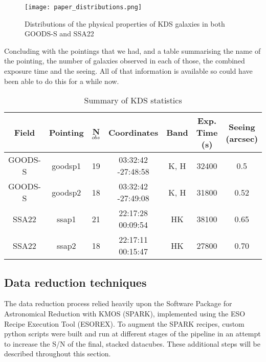\documentclass[a4paper,fleqn,usenatbib]{mn2e}
\begin{document}
\begin{figure}
\centering
\texttt{[image: paper\_distributions.png]}
\caption{Distributions of the physical properties of KDS galaxies in both GOODS-S and SSA22}
\label{fig:distributions}
\end{figure}

Concluding with the pointings that we had, and a table summarising the name of the pointing, the number of galaxies observed in each of those, the combined exposure time and the seeing. All of that information is available so could have been able to do this for a while now.

\begin{table*}
    \centering
\begin{tabular}{ c c c c c c c }

 \hline
Field & Pointing & N$_{obs}$ & Coordinates & Band & Exp. Time (s) & Seeing (arcsec)  \\
 \hline
 GOODS-S & goodsp1 & 19 & 03:32:42 -27:48:58 & K, H & 32400 & 0.5 \\
GOODS-S & goodsp2 & 18 & 03:32:42 -27:49:08 & K, H & 31800 & 0.52 \\
SSA22 & ssap1 & 21 & 22:17:28 00:09:54 & HK & 38100 & 0.65 \\
SSA22 & ssap2 & 18 & 22:17:11 00:15:47 & HK & 27800 & 0.70 \\
 \hline
\end{tabular}
\caption{Summary of KDS statistics}
\label{tab:KDS}
\end{table*}

\subsection{Data reduction techniques}
The data reduction process relied heavily upon the Software Package for Astronomical Reduction with KMOS (SPARK), implemented using the ESO Recipe Execution Tool (ESOREX).
To augment the SPARK recipes, custom python scripts were built and run at different stages of the pipeline in an attempt to increase the S/N of the final, stacked datacubes.
These additional steps will be described throughout this section.
\end{document}
